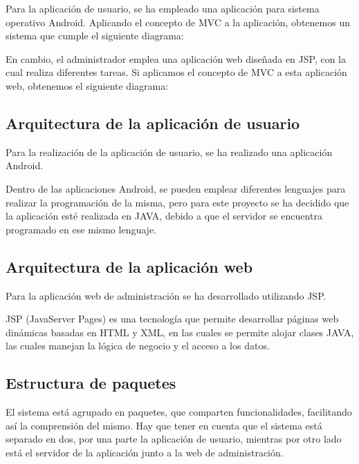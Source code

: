 Para la aplicación de usuario, se ha empleado una aplicación para sistema operativo Android. Aplicando el concepto de MVC a la aplicación, obtenemos un sistema que cumple el siguiente diagrama:


En cambio, el administrador emplea una aplicación web diseñada en JSP, con la cual realiza diferentes tareas. Si aplicamos el concepto de MVC a esta aplicación web, obtenemos el siguiente diagrama:


\subsection{Arquitectura de la aplicación de usuario}

Para la realización de la aplicación de usuario, se ha realizado una aplicación Android.

Dentro de las aplicaciones Android, se pueden emplear diferentes lenguajes para realizar la programación de la misma, pero para este proyecto se ha decidido que la aplicación esté realizada en JAVA, debido a que el servidor se encuentra programado en ese mismo lenguaje.


\subsection{Arquitectura de la aplicación web}

Para la aplicación web de administración se ha desarrollado utilizando JSP.

JSP (JavaServer Pages) es una tecnología que permite desarrollar páginas web dinámicas basadas en HTML y XML, en las cuales se permite alojar clases JAVA, las cuales manejan la lógica de negocio y el acceso a los datos.


\subsection{Estructura de paquetes}

El sistema está agrupado en paquetes, que comparten funcionalidades, facilitando así la comprensión del mismo. Hay que tener en cuenta que el sistema está separado en dos, por una parte la aplicación de usuario, mientras por otro lado está el servidor de la aplicación junto a la web de administración. 

